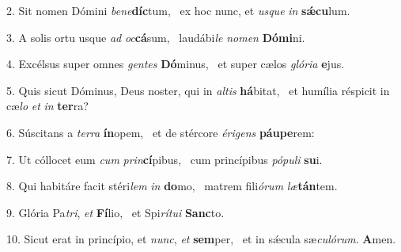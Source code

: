 2. Sit nomen Dómini \textit{be}\textit{ne}\textbf{díc}tum, \ast\  ex hoc nunc, et \textit{us}\textit{que} \textit{in} \textbf{sǽ}\textbf{cu}lum.\

3. A solis ortu usque \textit{ad} \textit{oc}\textbf{cá}sum, \ast\  laudábi\textit{le} \textit{no}\textit{men} \textbf{Dó}\textbf{mi}ni.\

4. Excélsus super omnes \textit{gen}\textit{tes} \textbf{Dó}minus, \ast\  et super cælos \textit{gló}\textit{ri}\textit{a} \textbf{e}jus.\

5. Quis sicut Dóminus, Deus noster, qui in \textit{al}\textit{tis} \textbf{há}bitat, \ast\  et humília réspicit in cæ\textit{lo} \textit{et} \textit{in} \textbf{ter}ra?\

6. Súscitans a \textit{ter}\textit{ra} \textbf{ín}opem, \ast\  et de stércore \textit{é}\textit{ri}\textit{gens} \textbf{páu}\textbf{pe}rem:\

7. Ut cóllocet eum \textit{cum} \textit{prin}\textbf{cí}pibus, \ast\  cum princípibus \textit{pó}\textit{pu}\textit{li} \textbf{su}i.\

8. Qui habitáre facit stéri\textit{lem} \textit{in} \textbf{do}mo, \ast\  matrem fili\textit{ó}\textit{rum} \textit{læ}\textbf{tán}tem.\

9. Glória Pa\textit{tri}, \textit{et} \textbf{Fí}lio, \ast\  et Spi\textit{rí}\textit{tu}\textit{i} \textbf{Sanc}to.\

10. Sicut erat in princípio, et \textit{nunc}, \textit{et} \textbf{sem}per, \ast\  et in sǽcula sæ\textit{cu}\textit{ló}\textit{rum}. \textbf{A}men.\

